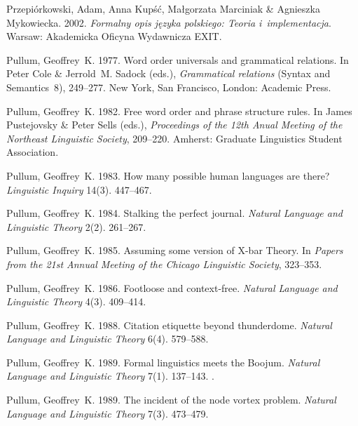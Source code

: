 \begin{thebibliography}{1420}
Przepi{\'o}rkowski, Adam, Anna Kup{\'s}{\'c}, Ma{\l}gorzata Marciniak \&
  Agnieszka Mykowiecka. 2002.
\newblock \emph{{Formalny opis j{\k e}zyka polskiego: Teoria i~implementacja}}.
\newblock Warsaw: Akademicka Oficyna Wydawnicza EXIT.

Pullum, Geoffrey~K. 1977.
\newblock Word order universals and grammatical relations.
\newblock In Peter Cole \& Jerrold~M. Sadock (eds.), \emph{Grammatical
  relations} (Syntax and Semantics~8), 249--277. New York, San Francisco,
  London: Academic Press.

Pullum, Geoffrey~K. 1982.
\newblock Free word order and phrase structure rules.
\newblock In James Pustejovsky \& Peter Sells (eds.), \emph{Proceedings of the
  {12th Anual Meeting of the Northeast Linguistic Society}}, 209--220. Amherst:
  Graduate Linguistics Student Association.

Pullum, Geoffrey~K. 1983.
\newblock How many possible human languages are there?
\newblock \emph{Linguistic Inquiry} 14(3). 447--467.

Pullum, Geoffrey~K. 1984.
\newblock Stalking the perfect journal.
\newblock \emph{Natural Language and Linguistic Theory} 2(2). 261--267.

Pullum, Geoffrey~K. 1985.
\newblock Assuming some version of {X-bar Theory}.
\newblock In \emph{Papers from the {21st Annual Meeting of the Chicago
  Linguistic Society}}, 323--353.

Pullum, Geoffrey~K. 1986.
\newblock Footloose and context-free.
\newblock \emph{Natural Language and Linguistic Theory} 4(3). 409--414.

Pullum, Geoffrey~K. 1988.
\newblock Citation etiquette beyond thunderdome.
\newblock \emph{Natural Language and Linguistic Theory} 6(4). 579--588.

Pullum, Geoffrey~K. 1989{}.
\newblock Formal linguistics meets the {Boojum}.
\newblock \emph{Natural Language and Linguistic Theory} 7(1). 137--143.
\newblock {}.

Pullum, Geoffrey~K. 1989{}.
\newblock The incident of the node vortex problem.
\newblock \emph{Natural Language and Linguistic Theory} 7(3). 473--479.


\end{thebibliography}
